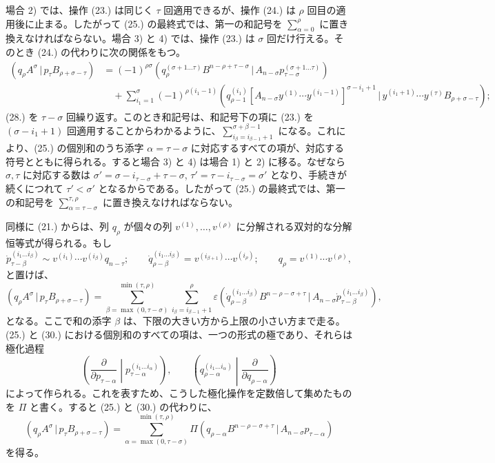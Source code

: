 \documentclass[11pt]{jlreq}
\newcommand{\pair}[2]{(#1\,|\,#2)}
\newcommand{\eps}{\varepsilon}
\begin{document}
場合 2) では、操作 (23.) は同じく $\tau$ 回適用できるが、操作 (24.) は $\rho$ 回目の適用後に止まる。したがって (25.) の最終式では、第一の和記号を $\sum_{\alpha=0}^{\rho}$ に置き換えなければならない。場合 3) と 4) では、操作 (23.) は $\sigma$ 回だけ行える。そのとき (24.) の代わりに次の関係をもつ。
\begin{equation}
\begin{aligned}
\pair{q_\rho A^\sigma}{p_\tau B_{\rho+\sigma-\tau}}
&=(-1)^{\rho\sigma}
 \pair{q_\rho^{(\sigma+1\ldots\tau)}B^{n-\rho+\tau-\sigma}}{A_{n-\sigma}p_{\tau-\sigma}^{(\sigma+1\ldots\tau)}}\\
&\quad+\sum_{i_1=1}^{\sigma}(-1)^{\rho(i_1-1)}
 \pair{q_{\rho-1}^{(i_1)}[A_{n-\sigma}y^{(1)}\cdots y^{(i_1-1)}]^{\sigma-i_1+1}}
 {y^{(i_1+1)}\cdots y^{(\tau)}B_{\rho+\sigma-\tau}};
\end{aligned}
\tag{28}
\end{equation}
(28.) を $\tau-\sigma$ 回繰り返す。このとき和記号は、和記号下の項に (23.) を $(\sigma-i_1+1)$ 回適用することからわかるように、$\sum_{i_\beta=i_{\beta-1}+1}^{\sigma+\beta-1}$ になる。これにより、(25.) の個別和のうち添字 $\alpha=\tau-\sigma$ に対応するすべての項が、対応する符号とともに得られる。すると場合 3) と 4) は場合 1) と 2) に移る。なぜなら $\sigma,\tau$ に対応する数は $\sigma'=\sigma-i_{\tau-\sigma}+\tau-\sigma$, $\tau'=\tau-i_{\tau-\sigma}=\sigma'$ となり、手続きが続くにつれて $\tau'<\sigma'$ となるからである。したがって (25.) の最終式では、第一の和記号を $\sum_{\alpha=\tau-\sigma}^{\tau,\rho}$ に置き換えなければならない。

同様に (21.) からは、列 $q_\rho$ が個々の列 $v^{(1)},\ldots,v^{(\rho)}$ に分解される双対的な分解恒等式が得られる。もし
\begin{equation}
 \dot p_{\tau-\beta}^{(i_1\ldots i_\beta)}\sim v^{(i_1)}\cdots v^{(i_\beta)}q_{n-\tau};\qquad
 \dot q_{\rho-\beta}^{(i_1\ldots i_\beta)}=v^{(i_{\beta+1})}\cdots v^{(i_\rho)};\qquad
 q_\rho=v^{(1)}\cdots v^{(\rho)},
\tag{29}
\end{equation}
と置けば、
\begin{equation}
 \pair{q_\rho A^\sigma}{p_\tau B_{\rho+\sigma-\tau}}
 =\sum_{\beta=\max(0,\tau-\sigma)}^{\min(\tau,\rho)}
   \sum_{i_\beta=i_{\beta-1}+1}^{\rho}\eps
\pair{\dot q_{\rho-\beta}^{(i_1\ldots i_\beta)}B^{n-\rho-\sigma+\tau}}{A_{n-\sigma}\dot p_{\tau-\beta}^{(i_1\ldots i_\beta)}} ,
\tag{30}
\end{equation}
となる。ここで和の添字 $\beta$ は、下限の大きい方から上限の小さい方まで走る。(25.) と (30.) における個別和のすべての項は、一つの形式の極であり、それらは極化過程
\[
\left(\frac{\partial}{\partial p_{\tau-\alpha}}\middle|p_{\tau-\alpha}^{(i_1\ldots i_\alpha)}\right),\qquad
\left(q_{\rho-\alpha}^{(i_1\ldots i_\alpha)}\middle|\frac{\partial}{\partial q_{\rho-\alpha}}\right)
\]
によって作られる。これを表すため、こうした極化操作を定数倍して集めたものを $\Pi$ と書く。すると (25.) と (30.) の代わりに、
\begin{equation}
 \pair{q_\rho A^\sigma}{p_\tau B_{\rho+\sigma-\tau}}
 =\sum_{\alpha=\max(0,\tau-\sigma)}^{\min(\tau,\rho)}
 \Pi\pair{q_{\rho-\alpha}B^{n-\rho-\sigma+\tau}}{A_{n-\sigma}p_{\tau-\alpha}}
\tag{31}
\end{equation}
を得る。
\end{document}
